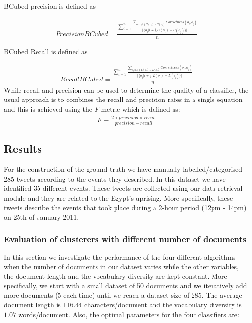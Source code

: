 BCubed precision is defined as 

\begin{eqnarray}
Precision BCubed = \frac{ \sum_{i=1}^{n} \frac{\sum_{o_j:i \neq j, C(o_i)=C(o_j)}^{} Correctness(o_i, o_j)}{\Vert \{ o_j | i \neq j, C(o_i) = C(o_j)  \}  \Vert} }{n}
\end{eqnarray} 

BCubed Recall is defined as

\begin{eqnarray}
Recall BCubed = \frac{ \sum_{i=1}^{n} \frac{\sum_{o_j:i \neq j, L(o_i)=L(o_j)}^{} Correctness(o_i, o_j)}{\Vert \{ o_j | i \neq j, L(o_i) = L(o_j)  \}  \Vert} }{n}
\end{eqnarray} 
While recall and precision can be used to determine the quality of a classifier, the usual approach is to combines the recall and precision rates in a single equation and this is 
achieved using the $F$ metric which is defined as:
\begin{eqnarray}
F = \frac{2 \times precision \times recall}{precision + recall}
\end{eqnarray} 
    
\subsection{Results}
For the construction of the ground truth we have manually labelled/categorised 285 tweets according to the events they described. In this dataset we have identified 35 different events. These tweets are collected using our data retrieval module and they are related to the Egypt's uprising. More specifically, these tweets describe the events that took place during a 2-hour period (12pm - 14pm) on 25th of January 2011.    

\subsubsection{Evaluation of clusterers with different number of documents}\label{EvalDiffNoDocs}
In this section we investigate the performance of the four different algorithms when the number of documents in our dataset varies while the other variables, the document length and the vocabulary diversity are kept constant. More specifically, we start with a small dataset of 50 documents and we iteratively add more documents (5 each time) until we reach a dataset size of 285. The average document length is $116.44$ characters/document and the vocabulary diversity is $1.07$ words/document. Also, the optimal parameters for the four classifiers are:

